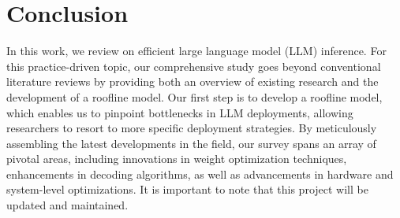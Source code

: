 


\section{Conclusion}
In this work, we review on efficient large language model (LLM) inference. 
For this practice-driven topic, our comprehensive study goes beyond conventional literature reviews by providing both an overview of existing research and the development of a roofline model. 
Our first step is to develop a roofline model, which enables us to pinpoint bottlenecks in LLM deployments, allowing researchers to resort to more specific deployment strategies. 
By meticulously assembling the latest developments in the field, our survey spans an array of pivotal areas, including innovations in weight optimization techniques, enhancements in decoding algorithms, as well as advancements in hardware and system-level optimizations.
It is important to note that this project will be updated and maintained.